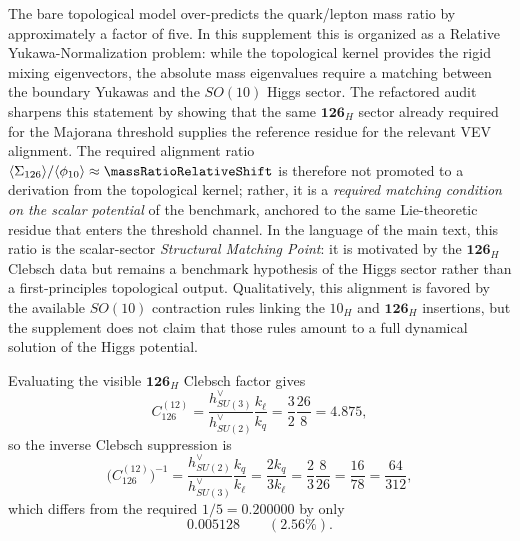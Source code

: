 \documentclass[11pt]{article}
\begin{document}
The bare topological model over-predicts the quark/lepton mass ratio by approximately a factor of five. In this supplement this is organized as a Relative Yukawa-Normalization problem: while the topological kernel provides the rigid mixing eigenvectors, the absolute mass eigenvalues require a matching between the boundary Yukawas and the $SO(10)$ Higgs sector. The refactored audit sharpens this statement by showing that the same $\mathbf{126}_H$ sector already required for the Majorana threshold supplies the reference residue for the relevant VEV alignment. The required alignment ratio $\langle \Sigma_{126} \rangle / \langle \phi_{10} \rangle\approx\massRatioRelativeShift$ is therefore not promoted to a derivation from the topological kernel; rather, it is a \emph{required matching condition on the scalar potential} of the benchmark, anchored to the same Lie-theoretic residue that enters the threshold channel. In the language of the main text, this ratio is the scalar-sector \emph{Structural Matching Point}: it is motivated by the $\mathbf{126}_H$ Clebsch data but remains a benchmark hypothesis of the Higgs sector rather than a first-principles topological output. Qualitatively, this alignment is favored by the available $SO(10)$ contraction rules linking the $10_H$ and $\mathbf{126}_H$ insertions, but the supplement does not claim that those rules amount to a full dynamical solution of the Higgs potential.

Evaluating the visible $\mathbf{126}_H$ Clebsch factor gives
\begin{equation}
 C_{126}^{(12)}
 =
 \frac{h^{\vee}_{SU(3)}}{h^{\vee}_{SU(2)}}\frac{k_{\ell}}{k_q}
 = \frac{3}{2}\frac{26}{8}
 = 4.875,
\end{equation}
so the inverse Clebsch suppression is
\begin{equation}
 \bigl(C_{126}^{(12)}\bigr)^{-1}
 =
 \frac{h^{\vee}_{SU(2)}}{h^{\vee}_{SU(3)}}\frac{k_q}{k_{\ell}}
 =
 \frac{2k_q}{3k_{\ell}}
 =
 \frac{2}{3}\frac{8}{26}
 =
 \frac{16}{78}
 =
 \frac{64}{312},
\end{equation}
which differs from the required $1/5=0.200000$ by only
\begin{equation}
 0.005128 \qquad (2.56\%).
\end{equation}
\end{document}
